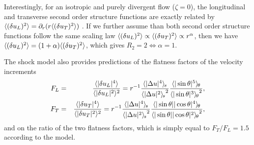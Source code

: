 Interestingly, for an isotropic and purely divergent flow ($\zeta =
0$), the longitudinal and transverse second order structure functions
are exactly related by $\langle (\delta u_L)^2 \rangle = \partial_r( r\langle (\delta
u_T)^2 \rangle )$ \cite[]{Lindborg2007jas}.
%
If we further assume than both second order structure functions follow
the same scaling law $\langle  (\delta u_L)^2 \rangle \propto \langle  (\delta
u_T)^2 \rangle \propto r^\alpha$, then we have $\langle  (\delta u_L)^2 \rangle =
(1+\alpha) \langle  (\delta u_T)^2 \rangle $, which gives $ R_2 = 2
\Leftrightarrow \alpha = 1$.


The shock model also provides predictions of the flatness factors of
the velocity increments
\begin{eqnarray}
F_L &=&  \frac{\langle |\delta u_L|^4 \rangle}{\langle |\delta u_L|^2 \rangle^2} 
= r^{-1} \frac{{\langle |\Delta u|^4 \rangle_{\hspace{-0.4mm}s}}}{{\langle |\Delta u|^2 \rangle_{\hspace{-0.4mm}s}}^2} 
\frac{{\langle |\sin\theta|^5 \rangle_{\hspace{-0.4mm}\theta}}}{{\langle |\sin\theta|^3 \rangle_{\hspace{-0.4mm}\theta}}^2},\\
F_T &=&  \frac{\langle |\delta u_T|^4 \rangle}{\langle |\delta u_T|^2 \rangle^2} 
= r^{-1} \frac{{\langle |\Delta u|^4 \rangle_{\hspace{-0.4mm}s}}}{{\langle |\Delta u|^2 \rangle_{\hspace{-0.4mm}s}}^2} 
\frac{{\langle |\sin\theta||\cos\theta|^4 \rangle_{\hspace{-0.4mm}\theta}}}{{\langle |\sin\theta||\cos\theta|^2 \rangle_{\hspace{-0.4mm}\theta}}^2},
\end{eqnarray}
and on the ratio of the two flatness factors, which is simply equal to
$F_T/F_L = 1.5$ according to the model.






